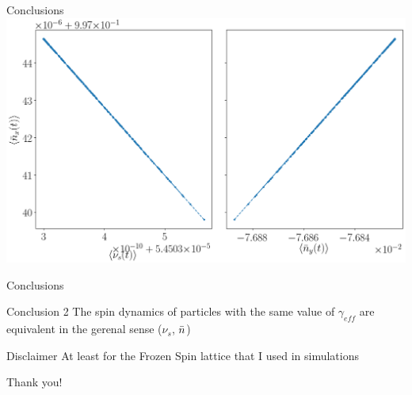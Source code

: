 \documentclass[14pt]{beamer}
\newcommand{\gef}{\gamma_{eff}}
\begin{document}
\begin{frame}{Conclusions}\centering
	\includegraphics[width=.9\linewidth]{decoh_sim/mean_n_bar_vs_spin_tune}
\end{frame}
\begin{frame}{Conclusions}
	\begin{block}{Conclusion 2}
		The spin dynamics of particles with the same value of $\gef$ are equivalent in the gerenal sense ($\nu_s$, $\bar n$)
	\end{block}
	\pause
	\begin{alertblock}{Disclaimer}
		At least for the Frozen Spin lattice that I used in simulations
	\end{alertblock}
\end{frame}

\begin{frame}
	\centering
	Thank you!
\end{frame}
\end{document}
